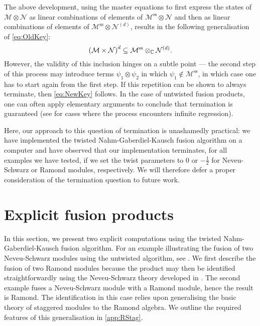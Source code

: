\documentclass[a4paper,reqno,12pt]{report}
\theoremstyle{definition}
\numberwithin{equation}{section}
\let\originalleft\left     %
\let\originalright\right
\renewcommand{\left}{\mathopen{}\mathclose\bgroup\originalleft}
\renewcommand{\right}{\aftergroup\egroup\originalright}
\newcommand{\brac}[1]{\left( #1 \right)}
\newcommand{\CC}{\mathbb{C}}
\newcommand{\spsub}[1]{#1^{\text{ss}}}       %
\newcommand{\fuse}{\mathbin{\times}}                                            %
\newcommand{\NGK}{Nahm-Gaberdiel-Kausch}
\newcommand{\ns}{Neveu-Schwarz}
\theoremstyle{plain}
\newcommand{\Mod}[1]{\mathcal{#1}}                 %
\begin{document}
The above development, using the master equations to first express the states of $\Mod{M} \otimes \Mod{N}$ as linear combinations of elements of $\spsub{\Mod{M}} \otimes \Mod{N}$ and then as linear combinations of elements of $\spsub{\Mod{M}} \otimes \Mod{N}^{(d)}$, results in the following generalisation of \eqref{eq:OldKey}:
\begin{equation} \label{eq:NewKey}
\brac{\Mod{M} \fuse \Mod{N}}^d \subseteq \spsub{\Mod{M}} \otimes_{\CC} \Mod{N}^{(d)}.
\end{equation}
However, the validity of this inclusion hinges on a subtle point --- the second step of this process may introduce terms $\psi_1 \otimes \psi_2$ in which $\psi_1 \notin \spsub{\Mod{M}}$, in which case one has to start again from the first step.  If this repetition can be shown to always terminate, then \eqref{eq:NewKey} follows.  In the case of untwisted fusion products, one can often apply elementary arguments to conclude that termination is guaranteed \cite{GabFus94} (see \cite{RidFus10} for cases where the process encounters infinite regression).

Here, our approach to this question of termination is unashamedly practical:  we have implemented the twisted \NGK{} fusion algorithm on a computer and have observed that our implementation terminates, for all examples we have tested, if we set the twist parameters to $0$ or $-\frac{1}{2}$ for \ns{} or Ramond modules, respectively.  We will therefore defer a proper consideration of the termination question to future work.

\section{Explicit fusion products} \label{sec:Examples}

In this section, we present two explicit computations using the twisted \NGK{} fusion algorithm.  For an example illustrating the fusion of two \ns{} modules using the untwisted algorithm, see \cite[Sec.~4]{CanFusI15}.  We first describe the fusion of two Ramond modules because the product may then be identified straightforwardly using the \ns{} theory developed in \cite{CanFusI15}.  The second example fuses a \ns{} module with a Ramond module, hence the result is Ramond.  The identification in this case relies upon generalising the basic theory of staggered modules \cite{RohRed96,RidSta09,CreLog13} to the Ramond algebra.  We outline the required features of this generalisation in \cref{app:RStag}.
\end{document}
